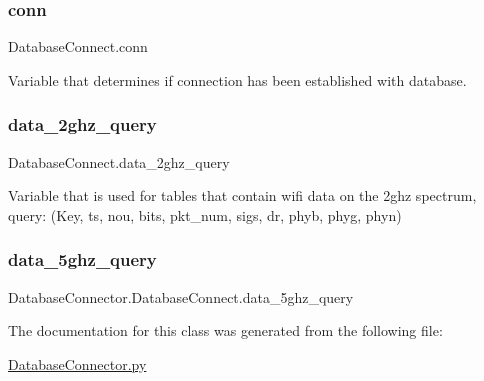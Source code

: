 \subsubsection{\texorpdfstring{conn}{conn}}
{\footnotesize\ttfamily Database\+Connect.\+conn}



Variable that determines if connection has been established with database. 

\mbox{\label{classDatabaseConnector_1_1DatabaseConnect_aa3b98ea56e1017172f5cee5e2369e667}} 
\subsubsection{\texorpdfstring{data\+\_\+2ghz\+\_\+query}{data\_2ghz\_query}}
{\footnotesize\ttfamily Database\+Connect.\+data\+\_\+2ghz\+\_\+query}



Variable that is used for tables that contain wifi data on the 2ghz spectrum, query\+: (Key, ts, nou, bits, pkt\+\_\+num, sigs, dr, phyb, phyg, phyn) 

\mbox{\label{classDatabaseConnector_1_1DatabaseConnect_a7dc062c3656c29ff946228c951c39254}} 
\subsubsection{\texorpdfstring{data\+\_\+5ghz\+\_\+query}{data\_5ghz\_query}}
{\footnotesize\ttfamily Database\+Connector.\+Database\+Connect.\+data\+\_\+5ghz\+\_\+query}



The documentation for this class was generated from the following file\+:\begin{DoxyCompactItemize}
\item 
\mbox{\hyperlink{DatabaseConnector_8py}{Database\+Connector.\+py}}\end{DoxyCompactItemize}
